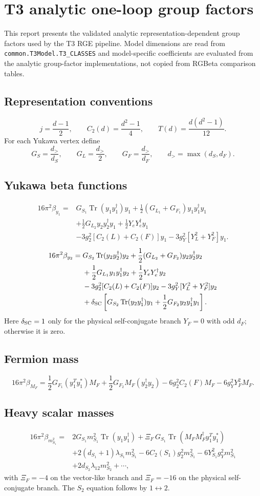 \documentclass[11pt]{article}
\begin{document}
\section*{T3 analytic one-loop group factors}
This report presents the validated analytic representation-dependent group factors used by the T3 RGE pipeline.  Model dimensions are read from \texttt{common.T3Model.T3\_CLASSES} and model-specific coefficients are evaluated from the analytic group-factor implementations, not copied from RGBeta comparison tables.
\subsection*{Representation conventions}
\[
j=\frac{d-1}{2},\qquad
C_2(d)=\frac{d^2-1}{4},\qquad
T(d)=\frac{d(d^2-1)}{12}.
\]
For each Yukawa vertex define
\[
G_S=\frac{d_>}{d_S},\qquad
G_L=\frac{d_>}{2},\qquad
G_F=\frac{d_>}{d_F},\qquad
d_>=\max(d_S,d_F).
\]
\subsection*{Yukawa beta functions}
\[
\begin{aligned}
16\pi^2\beta_{y_1}={}&
G_{S_1}\operatorname{Tr}(y_1y_1^\dagger)y_1
+\frac12(G_{L_1}+G_{F_1})y_1y_1^\dagger y_1\\
&+\frac12G_{L_2}y_2y_2^\dagger y_1
+\frac12Y_eY_e^\dagger y_1\\
&-3g_2^2[C_2(L)+C_2(F)]y_1
-3g_Y^2[Y_L^2+Y_F^2]y_1 .
\end{aligned}
\]
\[
\begin{aligned}
16\pi^2\beta_{y_2}={}&
G_{S_2}\operatorname{Tr}(y_2y_2^\dagger)y_2
+\frac12(G_{L_2}+G_{F_2})y_2y_2^\dagger y_2\\
&+\frac12G_{L_1}y_1y_1^\dagger y_2
+\frac12Y_eY_e^\dagger y_2\\
&-3g_2^2[C_2(L)+C_2(F)]y_2
-3g_Y^2[Y_L^2+Y_F^2]y_2\\
&+\delta_{\rm SC}\left[
G_{S_2}\operatorname{Tr}(y_2y_1^\dagger)y_1
+\frac12G_{F_2}y_2y_1^\dagger y_1
\right].
\end{aligned}
\]
Here $\delta_{\rm SC}=1$ only for the physical self-conjugate branch $Y_F=0$ with odd $d_F$; otherwise it is zero.
\subsection*{Fermion mass}
\[
16\pi^2\beta_{M_F}
=
\frac12G_{F_1}(y_1^Ty_1^*)M_F
+\frac12G_{F_2}M_F(y_2^\dagger y_2)
-6g_2^2C_2(F)M_F
-6g_Y^2Y_F^2M_F .
\]
\subsection*{Heavy scalar masses}
\[
\begin{aligned}
16\pi^2\beta_{m_{S_1}^2}={}&
2G_{S_1}m_{S_1}^2\operatorname{Tr}(y_1y_1^\dagger)
+\Xi_F\,G_{S_1}\operatorname{Tr}(M_FM_F^\dagger y_1^Ty_1^*)\\
&+2(d_{S_1}+1)\lambda_{S_1}m_{S_1}^2
-6C_2(S_1)g_2^2m_{S_1}^2
-6Y_{S_1}^2g_Y^2m_{S_1}^2\\
&+2d_{S_2}\lambda_{12}m_{S_2}^2+\cdots ,
\end{aligned}
\]
with $\Xi_F=-4$ on the vector-like branch and $\Xi_F=-16$ on the physical self-conjugate branch.  The $S_2$ equation follows by $1\leftrightarrow2$.
\end{document}
